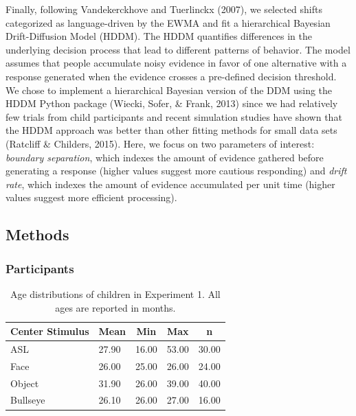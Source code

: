 \documentclass[english,floatsintext,man]{apa6}
\begin{document}
Finally, following Vandekerckhove and Tuerlinckx (2007), we selected
shifts categorized as language-driven by the EWMA and fit a hierarchical
Bayesian Drift-Diffusion Model (HDDM). The HDDM quantifies differences
in the underlying decision process that lead to different patterns of
behavior. The model assumes that people accumulate noisy evidence in
favor of one alternative with a response generated when the evidence
crosses a pre-defined decision threshold. We chose to implement a
hierarchical Bayesian version of the DDM using the HDDM Python package
(Wiecki, Sofer, \& Frank, 2013) since we had relatively few trials from
child participants and recent simulation studies have shown that the
HDDM approach was better than other fitting methods for small data sets
(Ratcliff \& Childers, 2015). Here, we focus on two parameters of
interest: \emph{boundary separation}, which indexes the amount of
evidence gathered before generating a response (higher values suggest
more cautious responding) and \emph{drift rate}, which indexes the
amount of evidence accumulated per unit time (higher values suggest more
efficient processing).

\hypertarget{methods}{%
\subsection{Methods}\label{methods}}

\hypertarget{participants}{%
\subsubsection{Participants}\label{participants}}

\begin{table}[tbp]
\begin{center}
\begin{threeparttable}
\caption{\label{tab:trio make participants table}Age distributions of children in Experiment 1. All ages are reported in months.}
\begin{tabular}{lllll}
\toprule
Center Stimulus & \multicolumn{1}{c}{Mean} & \multicolumn{1}{c}{Min} & \multicolumn{1}{c}{Max} & \multicolumn{1}{c}{n}\\
\midrule
ASL & 27.90 & 16.00 & 53.00 & 30.00\\
Face & 26.00 & 25.00 & 26.00 & 24.00\\
Object & 31.90 & 26.00 & 39.00 & 40.00\\
Bullseye & 26.10 & 26.00 & 27.00 & 16.00\\
\bottomrule
\end{tabular}
\end{threeparttable}
\end{center}
\end{table}
\end{document}
